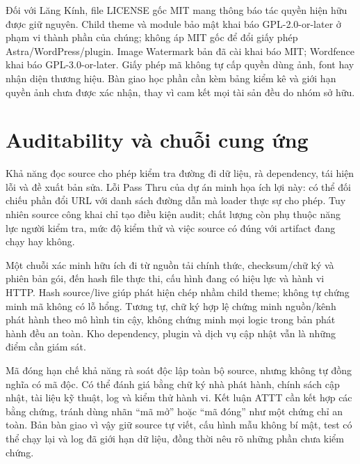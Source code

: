 Đối với Lăng Kính, file LICENSE gốc MIT mang thông báo tác quyền hiện hữu được giữ nguyên. Child theme và module bảo mật khai báo GPL-2.0-or-later ở phạm vi thành phần của chúng; không áp MIT gốc để đổi giấy phép Astra/WordPress/plugin. Image Watermark bản đã cài khai báo MIT; Wordfence khai báo GPL-3.0-or-later. Giấy phép mã không tự cấp quyền dùng ảnh, font hay nhận diện thương hiệu. Bàn giao học phần cần kèm bảng kiểm kê và giới hạn quyền ảnh chưa được xác nhận, thay vì cam kết mọi tài sản đều do nhóm sở hữu.

\section{Auditability và chuỗi cung ứng}
Khả năng đọc source cho phép kiểm tra đường đi dữ liệu, rà dependency, tái hiện lỗi và đề xuất bản sửa. Lỗi Pass Thru của dự án minh họa ích lợi này: có thể đối chiếu phần đổi URL với danh sách đường dẫn mà loader thực sự cho phép. Tuy nhiên source công khai chỉ tạo điều kiện audit; chất lượng còn phụ thuộc năng lực người kiểm tra, mức độ kiểm thử và việc source có đúng với artifact đang chạy hay không.

Một chuỗi xác minh hữu ích đi từ nguồn tải chính thức, checksum/chữ ký và phiên bản gói, đến hash file thực thi, cấu hình đang có hiệu lực và hành vi HTTP. Hash source/live giúp phát hiện chép nhầm child theme; không tự chứng minh mã không có lỗ hổng. Tương tự, chữ ký hợp lệ chứng minh nguồn/kênh phát hành theo mô hình tin cậy, không chứng minh mọi logic trong bản phát hành đều an toàn. Kho dependency, plugin và dịch vụ cập nhật vẫn là những điểm cần giám sát.

Mã đóng hạn chế khả năng rà soát độc lập toàn bộ source, nhưng không tự đồng nghĩa có mã độc. Có thể đánh giá bằng chữ ký nhà phát hành, chính sách cập nhật, tài liệu kỹ thuật, log và kiểm thử hành vi. Kết luận ATTT cần kết hợp các bằng chứng, tránh dùng nhãn ``mã mở'' hoặc ``mã đóng'' như một chứng chỉ an toàn. Bản bàn giao vì vậy giữ source tự viết, cấu hình mẫu không bí mật, test có thể chạy lại và log đã giới hạn dữ liệu, đồng thời nêu rõ những phần chưa kiểm chứng.
